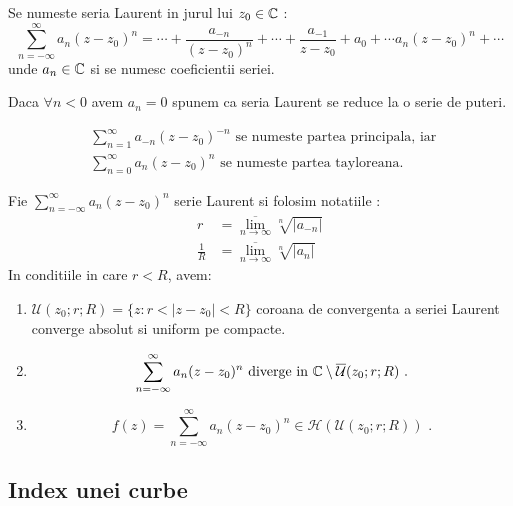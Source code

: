\begin{definition}
    Se numeste seria Laurent in jurul lui $z_0 \in \mathbb{C}$ :
    \begin{equation*}
        \sum_{n=-\infty}^{\infty} a_n(z-z_0)^n =
            \cdots + \frac{a_{-n}}{(z-z_0)^n} + \cdots + \frac{a_{-1}}{z-z_0} + a_0 + \cdots a_n(z-z_0)^n + \cdots
    \end{equation*}
    unde $a_n \in \mathbb{C}$ si se numesc coeficientii seriei.

    Daca $\forall n < 0$ avem $a_n = 0$ spunem ca seria Laurent se reduce la o serie de puteri.

    \begin{align*}
        &\sum_{n=1}^{\infty} a_{-n}(z-z_0)^{-n} \text { se numeste partea principala, iar } \\
        &\sum_{n=0}^{\infty} a_n(z-z_0)^n \text { se numeste partea tayloreana}.
    \end{align*}
\end{definition}

\begin{theorem}
    Fie $\displaystyle \sum_{n=-\infty}^{\infty} a_n(z-z_0)^n$ serie Laurent si folosim notatiile :
    \begin{align*}
        r &= \overline{\lim_{n \to \infty}} \sqrt[n]{|a_{-n}|} \\
        \frac{1}{R} &=\overline{\lim_{n \to \infty}} \sqrt[n]{|a_n|}
    \end{align*}
    In conditiile in care $r<R$, avem:
    \begin{enumerate}
        \item $\mathcal{U}(z_0;r;R) = \{z \colon r < |z-z_0| < R\}$
            coroana de convergenta a seriei Laurent converge absolut si uniform pe compacte.
        \item
            \[
                \sum_{n=-\infty}^{\infty} a_n(z-z_0)^n \text{ diverge in }
                    \mathbb{C} \setminus \overline{\mathcal{U}}(z_0;r;R) \text{ .}
            \]
        \item
            \[
                f(z) = \sum_{n=-\infty}^{\infty} a_n(z-z_0)^n \in \mathcal{H}(\mathcal{U}(z_0;r;R)) \text{ .}
            \]
    \end{enumerate}
\end{theorem}

\subsection{Index unei curbe}


